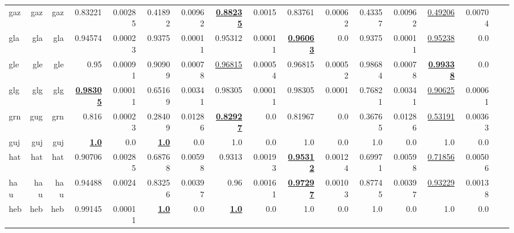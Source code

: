 \documentclass[11pt]{article}
\begin{document}
\begin{table*}[h]
{\begin{tabular}{lrrrrrrrrrrrrrrrr}
gaz         & gaz         & gaz         & 0.83221         & 0.00285         & 0.41892         & 0.00962         & \textbf{\underline{0.88235}}         & 0.0015         & 0.83761         & 0.00062         & 0.43357         & 0.00962         & \underline{0.49206}         & 0.00704         \\
gla         & gla         & gla         & 0.94574         & 0.00023         & 0.9375         & 0.00011         & 0.95312         & 0.00011         & \textbf{\underline{0.96063}}         & 0.0         & 0.9375         & 0.00011         & \underline{0.95238}         & 0.0         \\
gle         & gle         & gle         & 0.95         & 0.00091         & 0.90909         & 0.00078         & \underline{0.96815}         & 0.00054         & 0.96815         & 0.00052         & 0.98684         & 0.00078         & \textbf{\underline{0.99338}}         & 0.0         \\
glg         & glg         & glg         & \textbf{\underline{0.98305}}         & 0.00011         & 0.65169         & 0.00341         & 0.98305         & 0.00011         & 0.98305         & 0.0001         & 0.76821         & 0.00341         & \underline{0.90625}         & 0.00061         \\
grn         & gug         & grn         & 0.816         & 0.00023         & 0.28409         & 0.01286         & \textbf{\underline{0.82927}}         & 0.0         & 0.81967         & 0.0         & 0.36765         & 0.01286         & \underline{0.53191}         & 0.00363         \\
guj         & guj         & guj         & \textbf{\underline{1.0}}         & 0.0         & \textbf{\underline{1.0}}         & 0.0         & 1.0         & 0.0         & 1.0         & 0.0         & 1.0         & 0.0         & 1.0         & 0.0         \\
hat         & hat         & hat         & 0.90706         & 0.00285         & 0.68768         & 0.00598         & 0.9313         & 0.00193         & \textbf{\underline{0.95312}}         & 0.00124         & 0.69971         & 0.00598         & \underline{0.71856}         & 0.00506         \\
hau         & hau         & hau         & 0.94488         & 0.0024         & 0.83256         & 0.00397         & 0.96         & 0.00161         & \textbf{\underline{0.97297}}         & 0.00103         & 0.87745         & 0.00397         & \underline{0.93229}         & 0.00138         \\
heb         & heb         & heb         & 0.99145         & 0.00011         & \textbf{\underline{1.0}}         & 0.0         & \textbf{\underline{1.0}}         & 0.0         & 1.0         & 0.0         & 1.0         & 0.0         & 1.0         & 0.0         \\

\end{tabular}}
\end{table*}
\end{document}
